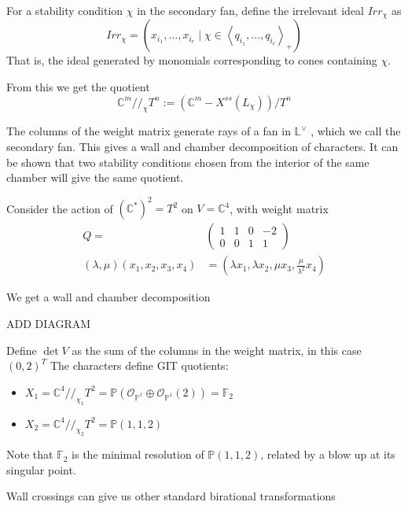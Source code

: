 \begin{definition}
	For a stability condition $\chi$ in the secondary fan, define the irrelevant ideal $Irr_\chi$ as $$
Irr_{\chi}= (x_{i_{1}},\dots,x_{i_{r}} \mid \chi \in \left< q_{i_{1}},\dots,q_{i_{r}}\right>_{+} )
$$ That is, the ideal generated by monomials corresponding to cones containing $\chi$. 
\end{definition}

From this we get the quotient $$
\mathbb{C}^{m}//_{\chi}T^{n}:= \left(\mathbb{C}^{m}-X^{ss}(L_{\chi})\right)  /T^n
$$

The columns of the weight matrix generate rays of a fan in $\mathbb{L}^\vee$ , which we call the secondary fan. This gives a wall and chamber decomposition of characters. It can be shown that two stability conditions chosen from the interior of the same chamber will give the same quotient. 

\begin{example}{}{}
	Consider the action of $(\mathbb{C}^{*})^{2}= T^2$ on $V = \mathbb{C}^4$, with weight matrix
\begin{align}
Q = &\begin{pmatrix}1&1&0&-2 \\ 0&0&1&1\end{pmatrix} \\
(\lambda,\mu)(x_1,x_2,x_3,x_{4})&= \left( \lambda x_{1}, \lambda x_{2},\mu x_{3}, \frac{\mu}{\lambda^{2}}x_4 \right)
\end{align}

We get a wall and chamber decomposition 

ADD DIAGRAM

Define $\det V$ as the sum of the columns in the weight matrix, in this case $(0,2)^T$
The characters define GIT quotients: 
\begin{itemize}
	\item  $X_{1}= \mathbb{C}^{4}//_{\chi_{1}}T^{2}= \mathbb{P}(\mathcal{O}_{\mathbb{P}^{1}}\oplus \mathcal{O}_{\mathbb{P}^{1}}(2)) = \mathbb{F}_2$
	\item  $X_{2}= \mathbb{C}^{4}//_{\chi_{2}}T^{2}= \mathbb{P}(1,1,2)$
\end{itemize}

Note that $\mathbb{F}_2$ is the minimal resolution of $\mathbb{P}(1,1,2)$, related by a blow up at its singular point.
\end{example}

Wall crossings can give us other standard birational transformations

